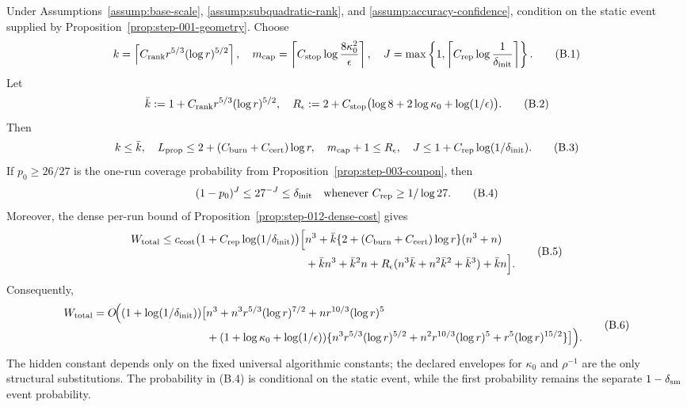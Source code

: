 \begin{proposition}\label{prop:rate-specialization-bridge}
Under Assumptions~\ref{assump:base-scale},
\ref{assump:subquadratic-rank}, and
\ref{assump:accuracy-confidence}, condition on the static event supplied by
Proposition~\ref{prop:step-001-geometry}.  Choose
\[
 k=\left\lceil C_{\rm rank}r^{5/3}(\log r)^{5/2}\right\rceil,
 \quad m_{\rm cap}=\left\lceil C_{\rm stop}\log\frac{8\kappa _0^2}{\epsilon}\right\rceil,
 \quad J=\max\left\{1,\left\lceil C_{\rm rep}\log\frac1{\delta_{\rm init}}\right\rceil\right\}.
\tag{B.1}
\]
Let
\[
 \bar k:=1+C_{\rm rank}r^{5/3}(\log r)^{5/2},\quad
 R_\epsilon:=2+C_{\rm stop}\bigl(\log 8+2\log\kappa _0+\log(1/\epsilon)\bigr).
\tag{B.2}
\]
Then
\[
 k\le\bar k,\quad
 L_{\rm prop}\le2+(C_{\rm burn}+C_{\rm cert})\log r,\quad
 m_{\rm cap}+1\le R_\epsilon,\quad
 J\le1+C_{\rm rep}\log(1/\delta_{\rm init}).
\tag{B.3}
\]
If $p_0\ge26/27$ is the one-run coverage probability from
Proposition~\ref{prop:step-003-coupon}, then
\[
 (1-p_0)^J\le27^{-J}\le\delta_{\rm init}
 \quad\text{whenever }C_{\rm rep}\ge1/\log 27.
\tag{B.4}
\]
Moreover, the dense per-run bound of
Proposition~\ref{prop:step-012-dense-cost} gives
\[
\begin{aligned}
W_{\rm total}
\le c_{\rm cost}\bigl(1+C_{\rm rep}\log(1/\delta_{\rm init})\bigr)
\Big[&n^3+\bar k\{2+(C_{\rm burn}+C_{\rm cert})\log r\}(n^3+n)\\
&+\bar k n^3+\bar k^2n
+R_\epsilon(n^3\bar k+n^2\bar k^2+\bar k^3)+\bar k n\Big].
\end{aligned}
\tag{B.5}
\]
Consequently,
\[
\begin{aligned}
W_{\rm total}=O\!\Big((1+\log(1/\delta_{\rm init}))\big[&n^3
+n^3r^{5/3}(\log r)^{7/2}+nr^{10/3}(\log r)^5\\
&+(1+\log\kappa _0+\log(1/\epsilon))
\{n^3r^{5/3}(\log r)^{5/2}
+n^2r^{10/3}(\log r)^5+r^5(\log r)^{15/2}\}\big]\Big).
\end{aligned}
\tag{B.6}
\]
The hidden constant depends only on the fixed universal algorithmic constants;
the declared envelopes for $\kappa _0$ and $\rho^{-1}$ are the only
structural substitutions.  The probability in (B.4) is conditional on the
static event, while the first probability remains the separate
$1-\delta_{\rm sm}$ event probability.
\end{proposition}

